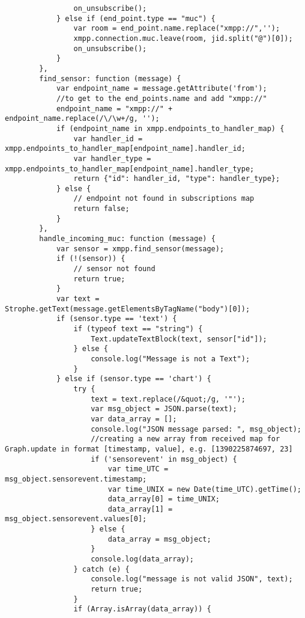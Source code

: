 \begin{lstlisting}
                on_unsubscribe();
            } else if (end_point.type == "muc") {
                var room = end_point.name.replace("xmpp://",'');
                xmpp.connection.muc.leave(room, jid.split("@")[0]);
                on_unsubscribe();
            }
        },
        find_sensor: function (message) {
            var endpoint_name = message.getAttribute('from');
            //to get to the end_points.name and add "xmpp://"
            endpoint_name = "xmpp://" + endpoint_name.replace(/\/\w+/g, '');
            if (endpoint_name in xmpp.endpoints_to_handler_map) {
                var handler_id = xmpp.endpoints_to_handler_map[endpoint_name].handler_id;
                var handler_type = xmpp.endpoints_to_handler_map[endpoint_name].handler_type;
                return {"id": handler_id, "type": handler_type};
            } else {
                // endpoint not found in subscriptions map
                return false;
            }
        },
        handle_incoming_muc: function (message) {
            var sensor = xmpp.find_sensor(message);
            if (!(sensor)) {
                // sensor not found
                return true;
            }
            var text = Strophe.getText(message.getElementsByTagName("body")[0]);
            if (sensor.type == 'text') {
                if (typeof text == "string") {
                    Text.updateTextBlock(text, sensor["id"]);
                } else {
                    console.log("Message is not a Text");
                }
            } else if (sensor.type == 'chart') {
                try {
                    text = text.replace(/&quot;/g, '"');
                    var msg_object = JSON.parse(text);
                    var data_array = [];
                    console.log("JSON message parsed: ", msg_object);
                    //creating a new array from received map for Graph.update in format [timestamp, value], e.g. [1390225874697, 23]
                    if ('sensorevent' in msg_object) {
                        var time_UTC = msg_object.sensorevent.timestamp;
                        var time_UNIX = new Date(time_UTC).getTime();
                        data_array[0] = time_UNIX;
                        data_array[1] = msg_object.sensorevent.values[0];
                    } else {
                        data_array = msg_object;
                    }
                    console.log(data_array);
                } catch (e) {
                    console.log("message is not valid JSON", text);
                    return true;
                }
                if (Array.isArray(data_array)) {

\end{lstlisting}
